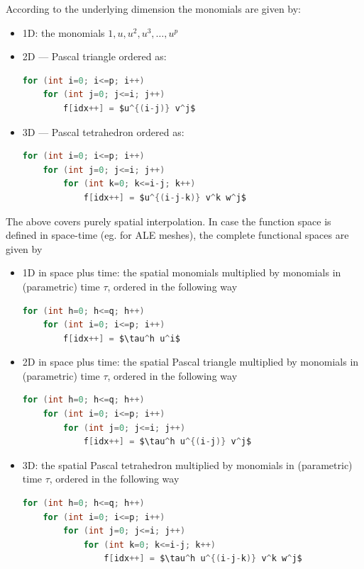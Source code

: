 \documentclass[11pt,letterpaper]{article}
\newenvironment{v2quote}
  {\begin{v2quoteframe}%
   \noindent{\footnotesize\sffamily\bfseries\color{cgnsblue}v2 text}%
   \nopagebreak\par\nopagebreak\vspace{0.15em}}
  {\end{v2quoteframe}}
\begin{document}
\begin{v2quote}
According to the underlying dimension the monomials are given by:
\begin{itemize}
  \item 1D: the monomials $1, u, u^2, u^3, \ldots, u^p$
  \item 2D --- Pascal triangle ordered as:
\begin{lstlisting}[language=C,numbers=none]
for (int i=0; i<=p; i++)
    for (int j=0; j<=i; j++)
        f[idx++] = $u^{(i-j)} v^j$
\end{lstlisting}
  \item 3D --- Pascal tetrahedron ordered as:
\begin{lstlisting}[language=C,numbers=none]
for (int i=0; i<=p; i++)
    for (int j=0; j<=i; j++)
        for (int k=0; k<=i-j; k++)
            f[idx++] = $u^{(i-j-k)} v^k w^j$
\end{lstlisting}
\end{itemize}
The above covers purely spatial interpolation. In case the function space is defined in
space-time (eg. for ALE meshes), the complete functional spaces are given by
\begin{itemize}
  \item 1D in space plus time: the spatial monomials multiplied by monomials in (parametric)
    time $\tau$, ordered in the following way
\begin{lstlisting}[language=C,numbers=none]
for (int h=0; h<=q; h++)
    for (int i=0; i<=p; i++)
        f[idx++] = $\tau^h u^i$
\end{lstlisting}
  \item 2D in space plus time: the spatial Pascal triangle multiplied by monomials in
    (parametric) time $\tau$, ordered in the following way
\begin{lstlisting}[language=C,numbers=none]
for (int h=0; h<=q; h++)
    for (int i=0; i<=p; i++)
        for (int j=0; j<=i; j++)
            f[idx++] = $\tau^h u^{(i-j)} v^j$
\end{lstlisting}
  \item 3D: the spatial Pascal tetrahedron multiplied by monomials in (parametric) time
    $\tau$, ordered in the following way
\begin{lstlisting}[language=C,numbers=none]
for (int h=0; h<=q; h++)
    for (int i=0; i<=p; i++)
        for (int j=0; j<=i; j++)
            for (int k=0; k<=i-j; k++)
                f[idx++] = $\tau^h u^{(i-j-k)} v^k w^j$
\end{lstlisting}
\end{itemize}
\end{v2quote}
\end{document}
